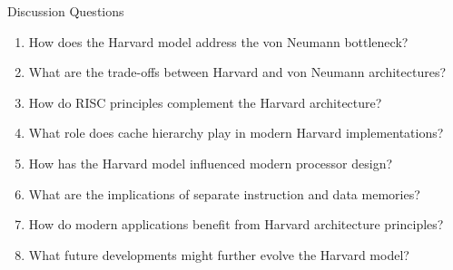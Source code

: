\begin{frame}{Discussion Questions}
\begin{enumerate}
\item How does the Harvard model address the von Neumann bottleneck?
\item What are the trade-offs between Harvard and von Neumann architectures?
\item How do RISC principles complement the Harvard architecture?
\item What role does cache hierarchy play in modern Harvard implementations?
\item How has the Harvard model influenced modern processor design?
\item What are the implications of separate instruction and data memories?
\item How do modern applications benefit from Harvard architecture principles?
\item What future developments might further evolve the Harvard model?
\end{enumerate}
\end{frame}

